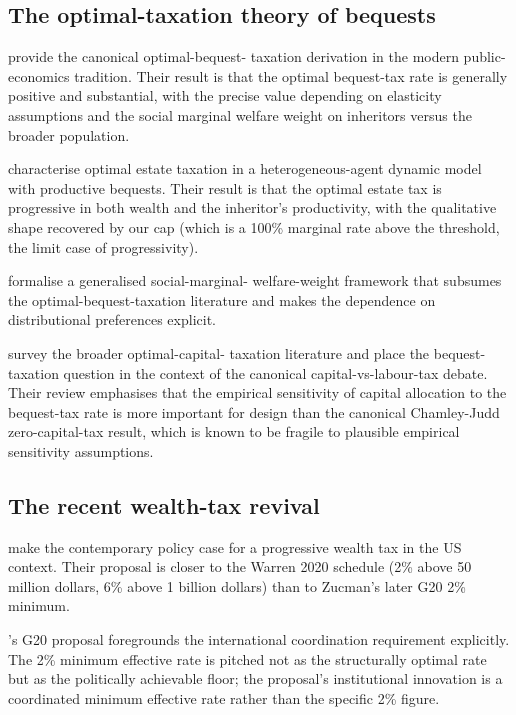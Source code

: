 \documentclass[11pt]{article}
\begin{document}
\subsection{The optimal-taxation theory of bequests}

\citet{piketty2013theory} provide the canonical optimal-bequest-
taxation derivation in the modern public-economics tradition.
Their result is that the optimal bequest-tax rate is generally
positive and substantial, with the precise value depending on
elasticity assumptions and the social marginal welfare weight on
inheritors versus the broader population.

\citet{farhi2010progressive} characterise optimal estate taxation
in a heterogeneous-agent dynamic model with productive bequests.
Their result is that the optimal estate tax is progressive in
both wealth and the inheritor's productivity, with the qualitative
shape recovered by our cap (which is a 100\% marginal rate above
the threshold, the limit case of progressivity).

\citet{saez2018social} formalise a generalised social-marginal-
welfare-weight framework that subsumes the optimal-bequest-taxation
literature and makes the dependence on distributional preferences
explicit.

\citet{bastani2020capital} survey the broader optimal-capital-
taxation literature and place the bequest-taxation question in the
context of the canonical capital-vs-labour-tax debate.  Their
review emphasises that the empirical sensitivity of capital
allocation to the bequest-tax rate is more important for design
than the canonical Chamley-Judd zero-capital-tax result, which is
known to be fragile to plausible empirical sensitivity assumptions.

\subsection{The recent wealth-tax revival}

\citet{saez2019triumph} make the contemporary policy case for a
progressive wealth tax in the US context.  Their proposal is closer
to the Warren 2020 schedule (2\% above 50 million dollars, 6\% above
1 billion dollars) than to Zucman's later G20 2\% minimum.

\citet{zucman2024global}'s G20 proposal foregrounds the international
coordination requirement explicitly.  The 2\% minimum effective
rate is pitched not as the structurally optimal rate but as the
politically achievable floor; the proposal's institutional
innovation is a coordinated minimum effective rate rather than the
specific 2\% figure.
\end{document}
